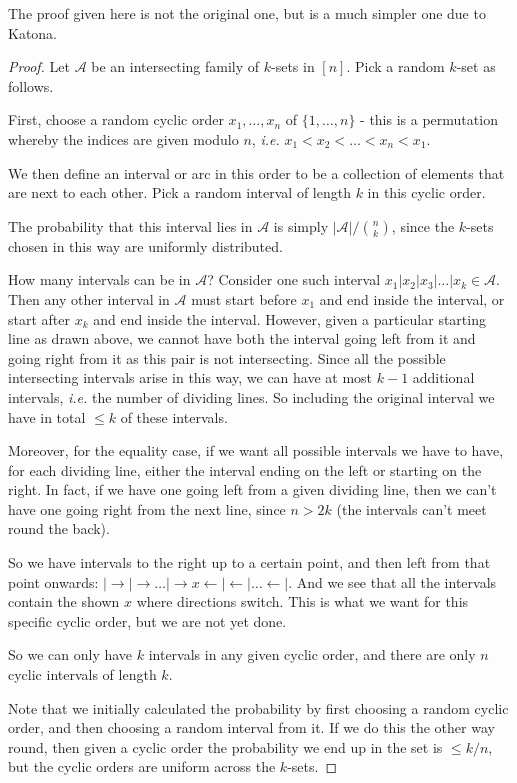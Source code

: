 \documentclass[]{article}
\theoremstyle{custhm}
\theoremstyle{cusdef}
\theoremstyle{custhm}
\theoremstyle{custhm}
\theoremstyle{custhm}
\theoremstyle{custhm}
\theoremstyle{cusdef}
\theoremstyle{remark}
\newcommand{\ra}{\rightarrow}
\newcommand{\ie}{\textit{i.e. }}
\newcommand{\A}{\mathcal{A}}
\begin{document}
The proof given here is not the original one, but is a much simpler one due to Katona.

\begin{proof}
Let $\A$ be an intersecting family of $k$-sets in $[n]$. Pick a random $k$-set as follows.

First, choose a random cyclic order $x_1,\dots,x_n$ of $\{1,\dots,n\}$ - this is a permutation whereby the indices are given modulo $n$, \ie$x_1 < x_2 < \dots < x_n < x_1$.

We then define an interval or arc in this order to be a collection of elements that are next to each other. Pick a random interval of length $k$ in this cyclic order.

The probability that this interval lies in $\A$ is simply $|\A|/{n\choose k}$, since the $k$-sets chosen in this way are uniformly distributed.

 How many intervals can be in $\A$? Consider one such interval $x_1|x_2|x_3|\dots|x_k \in \A$. Then any other interval in $\A$ must start before $x_1$ and end inside the interval, or start after $x_k$ and end inside the interval. However, given a particular starting line as drawn above, we cannot have both the interval going left from it and going right from it as this pair is not intersecting. Since all the possible intersecting intervals arise in this way, we can have at most $k-1$ additional intervals, \ie the number of dividing lines. So including the original interval we have in total $\le k$ of these intervals.

Moreover, for the equality case, if we want all possible intervals we have to have, for each dividing line, either the interval ending on the left or starting on the right. In fact, if we have one going left from a given dividing line, then we can't have one going right from the next line, since $n > 2k$ (the intervals can't meet round the back).

So we have intervals to the right up to a certain point, and then left from that point onwards: $|\ra|\ra\dots |\ra x \leftarrow |\leftarrow|\dots\leftarrow |$. And we see that all the intervals contain the shown $x$ where directions switch. This is what we want for this specific cyclic order, but we are not yet done.

So we can only have $k$ intervals in any given cyclic order, and there are only $n$ cyclic intervals of length $k$.

Note that we initially calculated the probability by first choosing a random cyclic order, and then choosing a random interval from it. If we do this the other way round, then given a cyclic order the probability we end up in the set is $\le k /n$, but the cyclic orders are uniform across the $k$-sets.


\end{proof}
\end{document}
